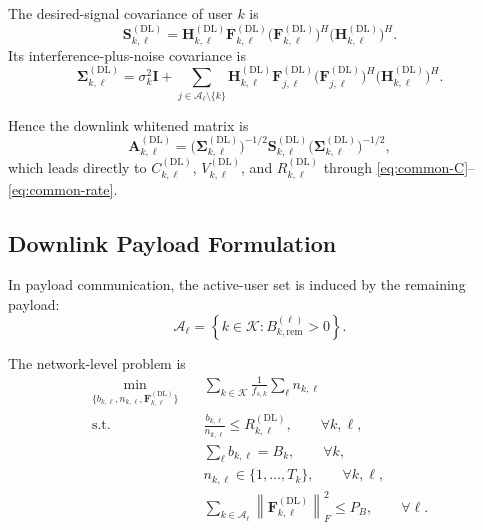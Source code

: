 \documentclass[11pt]{article}
\newcommand{\Kset}{\mathcal{K}}
\newcommand{\Aset}{\mathcal{A}}
\newcommand{\I}{\mathbf{I}}
\newcommand{\Hc}{\mathbf{H}}
\newcommand{\F}{\mathbf{F}}
\newcommand{\A}{\mathbf{A}}
\newcommand{\Sig}{\mathbf{\Sigma}}
\newcommand{\Smat}{\mathbf{S}}
\newcommand{\norm}[1]{\left\lVert #1 \right\rVert}
\newcommand{\DL}{\mathrm{DL}}
\begin{document}
The desired-signal covariance of user $k$ is
\begin{equation}
\Smat_{k,\ell}^{(\DL)}
=
\Hc_{k,\ell}^{(\DL)}
\F_{k,\ell}^{(\DL)}
\bigl(\F_{k,\ell}^{(\DL)}\bigr)^H
\bigl(\Hc_{k,\ell}^{(\DL)}\bigr)^H.
\label{eq:dl-signal-cov}
\end{equation}
Its interference-plus-noise covariance is
\begin{equation}
\Sig_{k,\ell}^{(\DL)}
=
\sigma_k^2\I
+
\sum_{j\in\Aset_\ell\setminus\{k\}}
\Hc_{k,\ell}^{(\DL)}
\F_{j,\ell}^{(\DL)}
\bigl(\F_{j,\ell}^{(\DL)}\bigr)^H
\bigl(\Hc_{k,\ell}^{(\DL)}\bigr)^H.
\label{eq:dl-disturbance-cov}
\end{equation}

Hence the downlink whitened matrix is
\begin{equation}
\A_{k,\ell}^{(\DL)}
=
\bigl(\Sig_{k,\ell}^{(\DL)}\bigr)^{-1/2}
\Smat_{k,\ell}^{(\DL)}
\bigl(\Sig_{k,\ell}^{(\DL)}\bigr)^{-1/2},
\label{eq:dl-A}
\end{equation}
which leads directly to
$C_{k,\ell}^{(\DL)}$, $V_{k,\ell}^{(\DL)}$, and
$R_{k,\ell}^{(\DL)}$ through
\eqref{eq:common-C}--\eqref{eq:common-rate}.

\subsection{Downlink Payload Formulation}

In payload communication, the active-user set is induced by the remaining
payload:
\begin{equation}
\Aset_\ell
=
\left\{
k\in\Kset : B_{k,\mathrm{rem}}^{(\ell)}>0
\right\}.
\label{eq:dl-active-payload}
\end{equation}

The network-level problem is
\begin{subequations}
\begin{align}
\min_{\{b_{k,\ell},n_{k,\ell},\F_{k,\ell}^{(\DL)}\}}
\quad
&
\sum_{k\in\Kset}\frac{1}{f_{s,k}}\sum_{\ell} n_{k,\ell}
\label{eq:dl-payload-obj}
\\
\text{s.t.}\quad
&
\frac{b_{k,\ell}}{n_{k,\ell}}
\le
R_{k,\ell}^{(\DL)},
\qquad \forall k,\ell,
\label{eq:dl-payload-fbl}
\\
&
\sum_{\ell} b_{k,\ell} = B_k,
\qquad \forall k,
\label{eq:dl-payload-conservation}
\\
&
n_{k,\ell} \in \{1,\dots,T_k\},
\qquad \forall k,\ell,
\label{eq:dl-payload-n}
\\
&
\sum_{k\in\Aset_\ell}\norm{\F_{k,\ell}^{(\DL)}}_F^2 \le P_B,
\qquad \forall \ell.
\label{eq:dl-payload-power}
\end{align}
\end{subequations}
\end{document}
